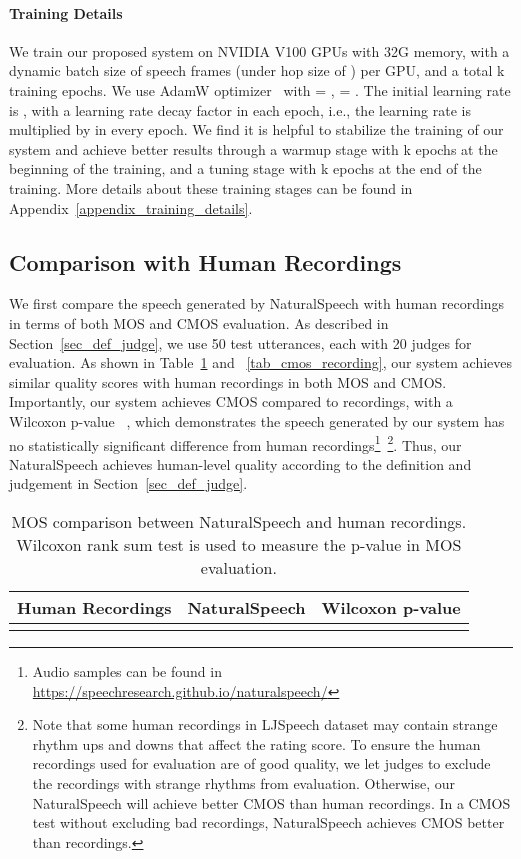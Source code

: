 \documentclass{article}
\theoremstyle{definition}
\def\myname{NaturalSpeech}
\begin{document}
\paragraph{Training Details}
\label{sec:training-details}
We train our proposed system on  NVIDIA V100 GPUs with 32G memory, with a dynamic batch size of  speech frames (under hop size of ) per GPU, and a total k training epochs. We use AdamW optimizer~\citep{loshchilov2018decoupled} with  = ,  = . The initial learning rate is , with a learning rate decay factor  in each epoch, i.e., the learning rate is multiplied by  in every epoch. We find it is helpful to stabilize the training of our system and achieve better results through a warmup stage with k epochs at the beginning of the training, and a tuning stage with k epochs at the end of the training. More details about these training stages can be found in Appendix~\ref{appendix_training_details}.



\subsection{Comparison with Human Recordings}
We first compare the speech generated by \myname{} with human recordings in terms of both MOS and CMOS evaluation. As described in Section~\ref{sec_def_judge}, we use 50 test utterances, each with 20 judges for evaluation. As shown in Table~\ref{tab_mos_recording} and ~\ref{tab_cmos_recording}, our system achieves similar quality scores with human recordings in both MOS and CMOS. Importantly, our system achieves  CMOS compared to recordings, with a Wilcoxon p-value~\citep{wilcoxon1992individual} , which demonstrates the speech generated by our system has no statistically significant difference from human recordings\footnote{Audio samples can be found in \url{https://speechresearch.github.io/naturalspeech/}}~\footnote{Note that some human recordings in LJSpeech dataset may contain strange rhythm ups and downs that affect the rating score. To ensure the human recordings used for evaluation are of good quality, we let judges to exclude the recordings with strange rhythms from evaluation. Otherwise, our \myname{} will achieve better CMOS than human recordings. In a CMOS test without excluding bad recordings, \myname{} achieves  CMOS better than recordings.}. Thus, our \myname{} achieves human-level quality according to the definition and judgement in Section~\ref{sec_def_judge}.



\begin{table}[h!]
\caption{MOS comparison between \myname{} and human recordings. Wilcoxon rank sum test is used to measure the p-value in MOS evaluation.}
\centering
\begin{tabular}{ccc}
	\toprule
	Human Recordings &\myname{} & Wilcoxon p-value \\
	\midrule
	 &  &  \\
	\bottomrule
\end{tabular}
\label{tab_mos_recording}
\end{table}
\end{document}
